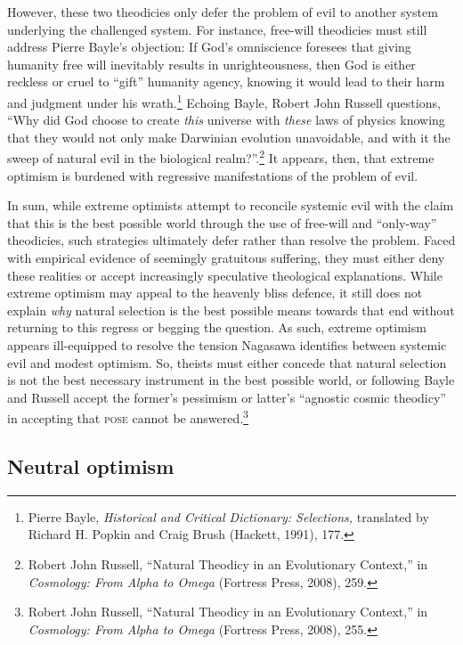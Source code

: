 However, these two theodicies only defer the problem of evil to another
system underlying the challenged system. For instance, free-will
theodicies must still address Pierre Bayle's objection: If God's
omniscience foresees that giving humanity free will inevitably results
in unrighteousness, then God is either reckless or cruel to ``gift''
humanity agency, knowing it would lead to their harm and judgment under
his wrath.\footnote{Pierre Bayle, \emph{Historical and Critical
  Dictionary: Selections,} translated by Richard H. Popkin and Craig
  Brush (Hackett, 1991), 177.} Echoing Bayle, Robert John Russell
questions, ``Why did God choose to create \emph{this} universe with
\emph{these} laws of physics knowing that they would not only make
Darwinian evolution unavoidable, and with it the sweep of natural evil
in the biological realm?''.\footnote{Robert John Russell, ``Natural
  Theodicy in an Evolutionary Context,'' in \emph{Cosmology: From Alpha
  to Omega} (Fortress Press, 2008), 259.} It appears, then, that extreme
optimism is burdened with regressive manifestations of the problem of
evil.

In sum, while extreme optimists attempt to reconcile systemic evil with
the claim that this is the best possible world through the use of
free-will and ``only-way'' theodicies, such strategies ultimately defer
rather than resolve the problem. Faced with empirical evidence of
seemingly gratuitous suffering, they must either deny these realities or
accept increasingly speculative theological explanations. While extreme
optimism may appeal to the heavenly bliss defence, it still does not
explain \emph{why} natural selection is the best possible means towards
that end without returning to this regress or begging the question. As
such, extreme optimism appears ill-equipped to resolve the tension
Nagasawa identifies between systemic evil and modest optimism. So,
theists must either concede that natural selection is not the best
necessary instrument in the best possible world, or following Bayle and
Russell accept the former's pessimism or latter's ``agnostic cosmic
theodicy'' in accepting that \textsc{pose} cannot be answered.\footnote{Robert John Russell, ``Natural Theodicy in an Evolutionary Context,'' in \emph{Cosmology: From Alpha
  to Omega} (Fortress Press, 2008), 255.}


\subsection{Neutral optimism}


